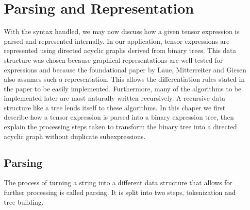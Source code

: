 \documentclass[12pt, a4paper]{report}
\begin{document}
\chapter{Parsing and Representation}
With the syntax handled, we may now discuss how a given tensor expression is parsed and represented internally.
In our application, tensor expressions are represented using directed acyclic graphs derived from binary trees.
This data structure was chosen because graphical representations are well tested for expressions and because the foundational paper by Laue, Mitterreiter and Giesen also assumes such a representation.
This allows the differentiation rules stated in the paper to be easily implemented.
Furthermore, many of the algorithms to be implemented later are most naturally written recursively.
A recursive data structure like a tree lends itself to these algorithms.
In this chaper we first describe how a tensor expression is parsed into a binary expression tree, then explain the processing steps taken to transform the binary tree into a directed acyclic graph without duplicate subexpressions.

\section{Parsing}
The process of turning a string into a different data structure that allows for further processing is called parsing.
It is split into two steps, tokenization and tree building.
\end{document}
